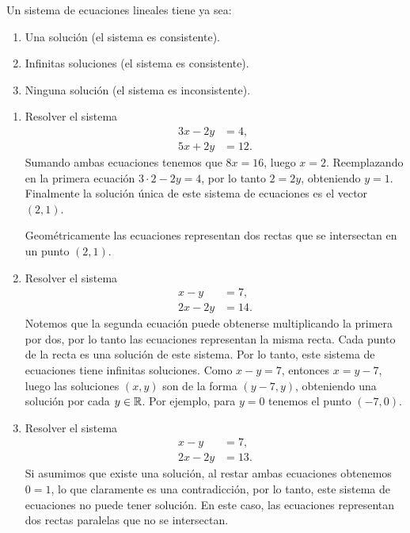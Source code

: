 Un sistema de ecuaciones lineales tiene ya sea:
\begin{enumerate}
    \item Una solución (el sistema es consistente).
    \item Infinitas soluciones (el sistema es consistente).
    \item Ninguna solución (el sistema es inconsistente).
\end{enumerate}
\begin{ejem}
\begin{enumerate}
    \item Resolver el sistema 
\begin{align*}
    3x -2y &= 4,\\
    5x + 2y &= 12.
\end{align*}
Sumando ambas ecuaciones tenemos que $8x=16$, luego $x=2$. Reemplazando en la primera ecuaci\'on $3\cdot 2-2y=4$, por lo tanto $2=2y$, obteniendo $y=1$. Finalmente la solución única de este sistema de ecuaciones es el vector $(2, 1)$.

Geom\'etricamente las ecuaciones representan dos rectas que se
intersectan en un punto $(2, 1)$.
    
    \item Resolver el sistema 
    \begin{align*}
    x -y &= 7,\\
    2x -2y &= 14.
\end{align*}
Notemos que la segunda ecuaci\'on puede obtenerse multiplicando la primera por dos, por lo tanto las ecuaciones representan la misma recta. Cada punto de la recta es una solución de este sistema. Por lo tanto, este sistema de ecuaciones tiene infinitas soluciones. Como $x -y = 7$, entonces $x = y -7$, luego las soluciones $(x,y)$ son de la forma $(y-7,y)$, obteniendo una soluci\'on por cada $y\in \mathbb{R}$. Por ejemplo, para $y=0$ tenemos el punto $(-7,0)$.

    \item Resolver el sistema 
    \begin{align*}
    x -y &= 7,\\
    2x -2y &= 13.
\end{align*}
Si asumimos que existe una soluci\'on, al restar ambas ecuaciones obtenemos $0=1$, lo que claramente es una contradicci\'on, por lo tanto, este sistema de ecuaciones no puede tener solución. En este caso, las ecuaciones representan dos rectas paralelas que no se intersectan.
\end{enumerate}
\end{ejem}

